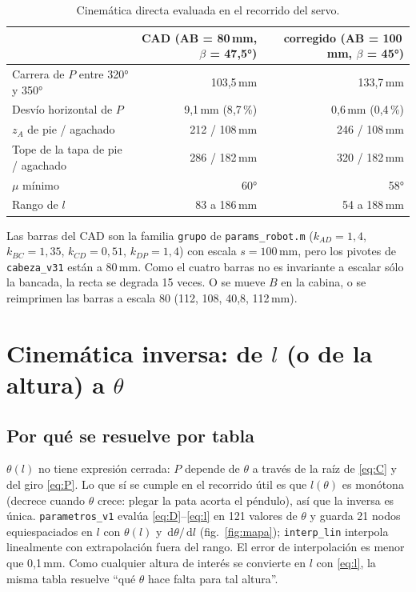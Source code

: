 \documentclass[11pt,a4paper]{article}
\newcommand{\code}[1]{\texttt{#1}}
\newcommand{\dd}{\,\mathrm{d}}
\begin{document}
\begin{table}[H]
  \centering\small
  \begin{tabular}{lrr}
    \toprule
     & CAD (AB = 80\,mm, $\beta$ = 47{,}5°) & corregido (AB = 100\,mm, $\beta$ = 45°) \\
    \midrule
    Carrera de $P$ entre 320° y 350° & 103{,}5\,mm & 133{,}7\,mm \\
    Desvío horizontal de $P$ & 9{,}1\,mm (8{,}7\,\%) & 0{,}6\,mm (0{,}4\,\%) \\
    $z_A$ de pie / agachado & 212 / 108\,mm & 246 / 108\,mm \\
    Tope de la tapa de pie / agachado & 286 / 182\,mm & 320 / 182\,mm \\
    $\mu$ mínimo & 60° & 58° \\
    Rango de $l$ & 83 a 186\,mm & 54 a 188\,mm \\
    \bottomrule
  \end{tabular}
  \caption{Cinemática directa evaluada en el recorrido del servo.}
\end{table}

Las barras del CAD son la familia \code{grupo} de \code{params\_robot.m} ($k_{AD} = 1{,}4$,
$k_{BC} = 1{,}35$, $k_{CD} = 0{,}51$, $k_{DP} = 1{,}4$) con escala $s = 100$\,mm, pero los pivotes de
\code{cabeza\_v31} están a 80\,mm. Como el cuatro barras no es invariante a escalar sólo la bancada,
la recta se degrada 15 veces. O se mueve $B$ en la cabina, o se reimprimen las barras a escala 80
(112, 108, 40{,}8, 112\,mm).

\section{Cinemática inversa: de $l$ (o de la altura) a $\theta$}

\subsection{Por qué se resuelve por tabla}

$\theta(l)$ no tiene expresión cerrada: $P$ depende de $\theta$ a través de la raíz de
\eqref{eq:C} y del giro \eqref{eq:P}. Lo que sí se cumple en el recorrido útil es que $l(\theta)$
es monótona (decrece cuando $\theta$ crece: plegar la pata acorta el péndulo), así que la inversa
es única. \code{parametros\_v1} evalúa \eqref{eq:D}--\eqref{eq:l} en 121 valores de $\theta$ y guarda
21 nodos equiespaciados en $l$ con $\theta(l)$ y $\dd\theta/\dd l$ (fig.~\ref{fig:mapa});
\code{interp\_lin} interpola linealmente con extrapolación fuera del rango. El error de interpolación
es menor que 0{,}1\,mm. Como cualquier altura de interés se convierte en $l$ con \eqref{eq:l}, la
misma tabla resuelve ``qué $\theta$ hace falta para tal altura''.
\end{document}
